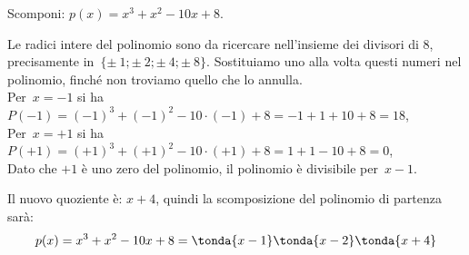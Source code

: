 \begin{esempio}{}{}
Scomponi: \(p(x)=x^3+x^2-10x+8\).
\end{esempio}
\begin{soluzione}{}{}
Le radici intere del polinomio sono da ricercare nell'insieme dei 
divisori di \(8\), precisamente in~\(\{\pm~1;\pm~2;\pm~4;\pm~8\}\).
Sostituiamo uno alla volta questi numeri nel polinomio, finché non 
troviamo quello che lo annulla.\\
Per~\(x=-1\) si ha
\(P(-1)=(-1)^{3}+(-1)^{2}-10\cdot (-1)+8=-1+1+10+8=18\),\\
Per~\(x=+1\) si ha
\(P(+1)=(+1)^{3}+(+1)^{2}-10\cdot (+1)+8=1+1-10+8=0\),\\
Dato che \(+1\) è uno zero del polinomio, il polinomio è divisibile 
per~\(x-1\).


Il nuovo quoziente è: \(x+4\), quindi la scomposizione del polinomio di 
partenza sarà:
\[p(x)=x^3+x^2-10x+8 = \tonda{x-1} \tonda{x-2} \tonda{x+4}\]
\end{soluzione}


